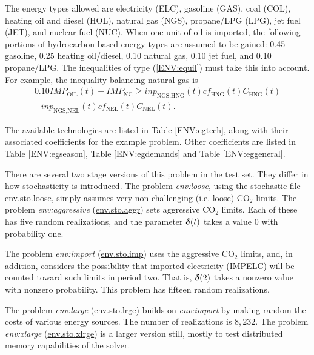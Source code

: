 The energy types allowed are electricity (ELC), gasoline (GAS), coal (COL), heating oil and diesel (HOL), natural gas (NGS), propane/LPG (LPG), jet fuel (JET), and nuclear fuel (NUC).  When one unit of oil is imported, the following portions of hydrocarbon based energy types are assumed to be gained:  0.45 gasoline, 0.25 heating oil/diesel, 0.10 natural gas, 0.10 jet fuel, and 0.10 propane/LPG.  The inequalities of type (\ref{ENV:equil}) must take this into account.  For example, the inequality balancing natural gas is
\begin{multline*}
0.10 IMP_{\text{OIL}}(t) + IMP_{\text{NG}} \geq inp_{\text{NGS,HNG}}(t)cf_{\text{HNG}}(t)C_{\text{HNG}}(t) \\+ inp_{\text{NGS,NEL}}(t)cf_{\text{NEL}}(t)C_{\text{NEL}}(t).
\end{multline*}

The available technologies are listed in Table \ref{ENV:egtech}, along with their associated coefficients for the example problem.  Other coefficients are listed in Table \ref{ENV:egseason}, Table \ref{ENV:egdemands} and Table \ref{ENV:eggeneral}.

There are several two stage versions of this problem in the test set.  They differ in how stochasticity is introduced.  The problem \emph{env:loose}, using the stochastic file \url{env.sto.loose}, simply assumes very non-challenging (i.e. loose) $\text{CO}_2$ limits.  The problem \emph{env:aggressive} (\url{env.sto.aggr}) sets aggressive $\text{CO}_2$ limits.  Each of these has five random realizations, and the parameter $\mathbf{\boldsymbol{\delta}}(t)$ takes a value $0$ with probability one.

The problem \emph{env:import} (\url{env.sto.imp}) uses the aggressive $\text{CO}_2$ limits, and, in addition, considers the possibility that imported electricity (IMPELC) will be counted toward such limits in period two.  That is, $\mathbf{\boldsymbol{\delta}}(2)$ takes a nonzero value with nonzero probability.  This problem has fifteen random realizations.

The problem \emph{env:large} (\url{env.sto.lrge}) builds on \emph{env:import} by making random the costs of various energy sources.  The number of realizations is $8,232$.  The problem \emph{env:xlarge} (\url{env.sto.xlrge}) is a larger version still, mostly to test distributed memory capabilities of the solver.

